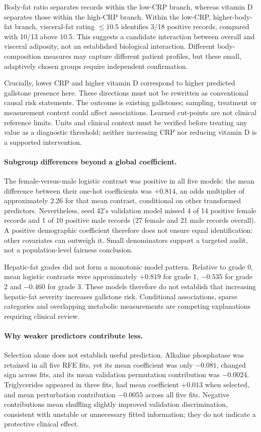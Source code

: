 Body-fat ratio separates records within the low-CRP branch, whereas vitamin D separates those within the high-CRP branch. Within the low-CRP, higher-body-fat branch, visceral-fat rating $\leq10.5$ identifies 3/18 positive records, compared with 10/13 above 10.5. This suggests a candidate interaction between overall and visceral adiposity, not an established biological interaction. Different body-composition measures may capture different patient profiles, but these small, adaptively chosen groups require independent confirmation.

Crucially, lower CRP and higher vitamin D correspond to higher predicted gallstone presence here. These directions must not be rewritten as conventional causal risk statements. The outcome is existing gallstones; sampling, treatment or measurement context could affect associations. Learned cut-points are not clinical reference limits. Units and clinical context must be verified before treating any value as a diagnostic threshold; neither increasing CRP nor reducing vitamin D is a supported intervention.

\paragraph{Subgroup differences beyond a global coefficient.}
The female-versus-male logistic contrast was positive in all five models: the mean difference between their one-hot coefficients was $+0.814$, an odds multiplier of approximately 2.26 for that mean contrast, conditional on other transformed predictors. Nevertheless, seed 42's validation model missed 4 of 14 positive female records and 1 of 10 positive male records (27 female and 21 male records overall). A positive demographic coefficient therefore does not ensure equal identification: other covariates can outweigh it. Small denominators support a targeted audit, not a population-level fairness conclusion.

Hepatic-fat grades did not form a monotonic model pattern. Relative to grade 0, mean logistic contrasts were approximately $+0.819$ for grade 1, $-0.535$ for grade 2 and $-0.460$ for grade 3. These models therefore do not establish that increasing hepatic-fat severity increases gallstone risk. Conditional associations, sparse categories and overlapping metabolic measurements are competing explanations requiring clinical review.

\paragraph{Why weaker predictors contribute less.}
Selection alone does not establish useful prediction. Alkaline phosphatase was retained in all five RFE fits, yet its mean coefficient was only $-0.081$, changed sign across fits, and its mean validation permutation contribution was $-0.0024$. Triglycerides appeared in three fits, had mean coefficient $+0.013$ when selected, and mean perturbation contribution $-0.0055$ across all five fits. Negative contributions mean shuffling slightly improved validation discrimination, consistent with unstable or unnecessary fitted information; they do not indicate a protective clinical effect.

